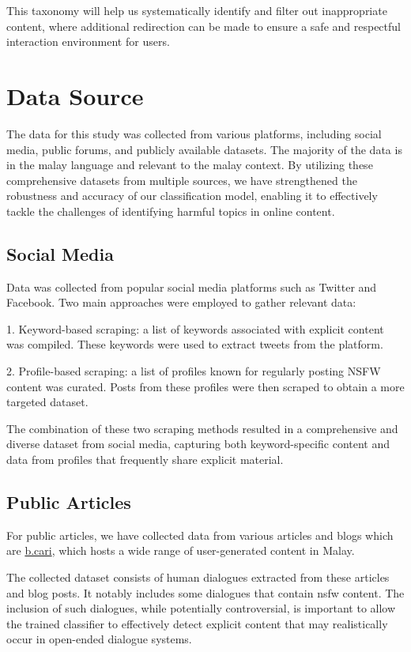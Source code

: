 \documentclass[preprint]{article}
\begin{document}
This taxonomy will help us systematically identify and filter out inappropriate content, where additional redirection can be made to ensure a safe and respectful interaction environment for users.

\section{Data Source}
The data for this study was collected from various platforms, including social media, public forums, and publicly available datasets. The majority of the data is in the malay language and relevant to the malay context.
By utilizing these comprehensive datasets from multiple sources, we have strengthened the robustness and accuracy of our classification model, enabling it to effectively tackle the challenges of identifying harmful topics in online content.
\subsection{Social Media}
Data was collected from popular social media platforms such as Twitter and Facebook. Two main approaches were employed to gather relevant data:

1. Keyword-based scraping: a list of keywords associated with explicit content was compiled. These keywords were used to extract tweets from the platform.

2. Profile-based scraping: a list of profiles known for regularly posting NSFW content was curated. Posts from these profiles were then scraped to obtain a more targeted dataset.

The combination of these two scraping methods resulted in a comprehensive and diverse dataset from social media, capturing both keyword-specific content and data from profiles that frequently share explicit material.


\subsection{Public Articles}

For public articles, we have collected data from various articles and blogs which are \href{http://b.cari.com.my}{b.cari}, which hosts a wide range of user-generated content in Malay.

The collected dataset consists of human dialogues extracted from these articles and blog posts. It notably includes some dialogues that contain nsfw content. The inclusion of such dialogues, while potentially controversial, is important to allow the trained classifier to effectively detect explicit content that may realistically occur in open-ended dialogue systems.
\end{document}
